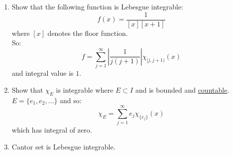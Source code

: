\begin{enumerate}
    \item Show that the following function
    is Lebesgue integrable:
    $$f(x)=\frac{1}{[x][x+1]}$$
    where $[x]$ denotes the floor function. \\

    So:
    $$f=\sum_{j=1}^{\infty}|\frac{1}{j(j+1)}|\chi_{[j,j+1)}(x)$$
    and integral value is $1$. \\

    \item Show that $\chi_E$ is integrable where $E\subset I$
    and is bounded and \underline{countable}. \\

    $E=\{e_1,e_2,\dots\}$ and so:
    $$\chi_E=\sum_{j=1}^{\infty}e_j\chi_{\{e_j\}}(x)$$
    which has integral of zero. \\

    \item Cantor set is Lebesgue integrable.
\end{enumerate}

\newpage

